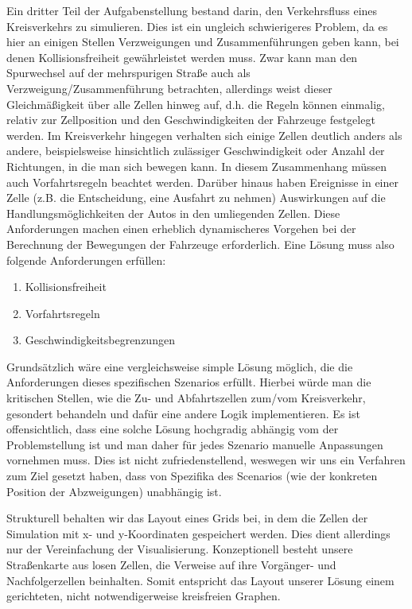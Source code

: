 \documentclass[11pt, a4paper]{article}
\begin{document}
Ein dritter Teil der Aufgabenstellung bestand darin, den Verkehrsfluss eines Kreisverkehrs zu simulieren. Dies ist ein ungleich schwierigeres Problem, da es hier an einigen Stellen Verzweigungen und Zusammenführungen geben kann, bei denen Kollisionsfreiheit gewährleistet werden muss. Zwar kann man den Spurwechsel auf der mehrspurigen Straße auch als Verzweigung/Zusammenführung betrachten, allerdings weist dieser Gleichmäßigkeit über alle Zellen hinweg auf, d.h. die Regeln können einmalig, relativ zur Zellposition und den Geschwindigkeiten der Fahrzeuge festgelegt werden. Im Kreisverkehr hingegen verhalten sich einige Zellen deutlich anders als andere, beispielsweise hinsichtlich zulässiger Geschwindigkeit oder Anzahl der Richtungen, in die man sich bewegen kann. In diesem Zusammenhang müssen auch Vorfahrtsregeln beachtet werden. Darüber hinaus haben Ereignisse in einer Zelle (z.B. die Entscheidung, eine Ausfahrt zu nehmen) Auswirkungen auf die Handlungsmöglichkeiten der Autos in den umliegenden Zellen. Diese Anforderungen machen einen erheblich dynamischeres Vorgehen bei der Berechnung der Bewegungen der Fahrzeuge erforderlich. Eine Lösung muss also folgende Anforderungen erfüllen:

\begin{enumerate}
	\item Kollisionsfreiheit
	\item Vorfahrtsregeln
	\item Geschwindigkeitsbegrenzungen
\end{enumerate}

Grundsätzlich wäre eine vergleichsweise simple Lösung möglich, die die Anforderungen dieses spezifischen Szenarios erfüllt. Hierbei würde man die kritischen Stellen, wie die Zu- und Abfahrtszellen zum/vom Kreisverkehr, gesondert behandeln und dafür eine andere Logik implementieren. Es ist offensichtlich, dass eine solche Lösung hochgradig abhängig vom der Problemstellung ist und man daher für jedes Szenario manuelle Anpassungen vornehmen muss. Dies ist nicht zufriedenstellend, weswegen wir uns ein Verfahren zum Ziel gesetzt haben, dass von Spezifika des Scenarios (wie der konkreten Position der Abzweigungen) unabhängig ist.

Strukturell behalten wir das Layout eines Grids bei, in dem die Zellen der Simulation mit x- und y-Koordinaten gespeichert werden. Dies dient allerdings nur der Vereinfachung der Visualisierung. Konzeptionell besteht unsere Straßenkarte aus losen Zellen, die Verweise auf ihre Vorgänger- und Nachfolgerzellen beinhalten. Somit entspricht das Layout unserer Lösung einem gerichteten, nicht notwendigerweise kreisfreien Graphen.
\end{document}
